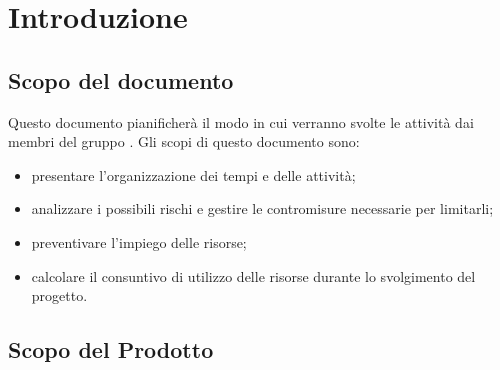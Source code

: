 %


\section{Introduzione}
	\subsection{Scopo del documento}
	Questo documento pianificherà il modo in cui verranno svolte le attività dai membri del gruppo \groupName.
	Gli scopi di questo documento sono:
		\begin{itemize}
			\item presentare l’organizzazione dei tempi e delle attività;
			\item analizzare i possibili rischi e gestire le contromisure necessarie per limitarli;
			\item preventivare l’impiego delle risorse;
			\item calcolare il consuntivo di utilizzo delle risorse durante lo svolgimento del progetto.
		\end{itemize}
		
	\subsection{Scopo del Prodotto}
		\productScope
		
